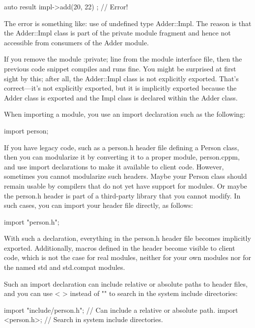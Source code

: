 \begin{cpp}
auto result { impl->add(20, 22) }; // Error!
\end{cpp}

The error is something like: use of undefined type Adder::Impl. The reason is that the Adder::Impl class is part of the private module fragment and hence not accessible from consumers of the Adder module.

If you remove the module :private; line from the module interface file, then the previous code snippet compiles and runs fine. You might be surprised at first sight by this; after all, the Adder::Impl class is not explicitly exported. That’s correct—it’s not explicitly exported, but it is implicitly exported because the Adder class is exported and the Impl class is declared within the Adder class.


When importing a module, you use an import declaration such as the following:

\begin{cpp}
import person;
\end{cpp}

If you have legacy code, such as a person.h header file defining a Person class, then you can modularize it by converting it to a proper module, person.cppm, and use import declarations to make it available to client code. However, sometimes you cannot modularize such headers. Maybe your Person class should remain usable by compilers that do not yet have support for modules. Or maybe the person.h header is part of a third-party library that you cannot modify. In such cases, you can import your header file directly, as follows:

\begin{cpp}
import "person.h";
\end{cpp}

With such a declaration, everything in the person.h header file becomes implicitly exported. Additionally, macros defined in the header become visible to client code, which is not the case for real modules, neither for your own modules nor for the named std and std.compat modules.

Such an import declaration can include relative or absolute paths to header files, and you can use < > instead of "" to search in the system include directories:

\begin{cpp}
import "include/person.h"; // Can include a relative or absolute path.
import <person.h>; // Search in system include directories.
\end{cpp}

